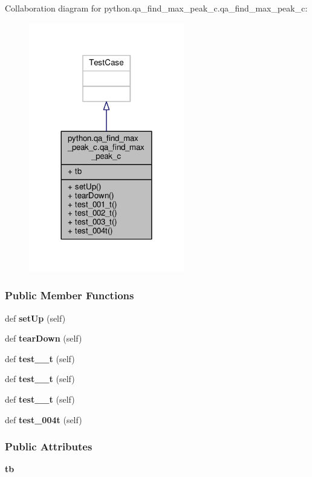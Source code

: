 Collaboration diagram for python.\+qa\+\_\+find\+\_\+max\+\_\+peak\+\_\+c.\+qa\+\_\+find\+\_\+max\+\_\+peak\+\_\+c\+:
\nopagebreak
\begin{figure}[H]
\begin{center}
\leavevmode
\includegraphics[width=192pt]{d8/de7/classpython_1_1qa__find__max__peak__c_1_1qa__find__max__peak__c__coll__graph}
\end{center}
\end{figure}
\subsubsection*{Public Member Functions}
\begin{DoxyCompactItemize}
\item 
def {\bf set\+Up} (self)
\item 
def {\bf tear\+Down} (self)
\item 
def {\bf test\+\_\+\_\+t} (self)
\item 
def {\bf test\+\_\+\_\+t} (self)
\item 
def {\bf test\+\_\+\_\+t} (self)
\item 
def {\bf test\+\_\+004t} (self)
\end{DoxyCompactItemize}
\subsubsection*{Public Attributes}
\begin{DoxyCompactItemize}
\item 
{\bf tb}
\end{DoxyCompactItemize}


